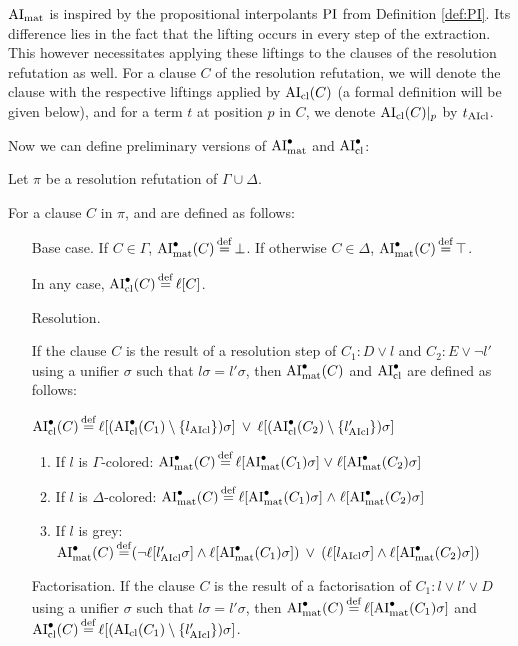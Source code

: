 \documentclass[,%
	draft=false,%
	numbers=noendperiod
	11pt,
	a4paper,
	oneside,%
	openany,
]{memoir}
\begin{document}
$\operatorname{AI}_\mathrm{mat}$ is inspired by the propositional interpolants $\operatorname{PI}$ from Definition \ref{def:PI}.
Its difference lies in the fact that the lifting occurs in every step of the extraction.
This however necessitates applying these liftings to the clauses of the resolution refutation as well.
For a clause $C$ of the resolution refutation, we will denote the clause with the respective liftings applied by $\operatorname{AI}_\mathrm{cl}(C)$ (a formal definition will be given below), and for a term $t$ at position $p$ in $C$, we denote $\operatorname{AI}_\mathrm{cl}(C)|_{p}$ by $t_{\operatorname{AIcl}}$.

Now we can define preliminary versions of $\operatorname{AI}_\mathrm{mat}^\bullet$ and $\operatorname{AI}_\mathrm{cl}^\bullet$:

\begin{defi}
	Let $\pi$ be a resolution refutation of $\Gamma \cup \Delta$.

	For a clause $C$ in $\pi$,  and  are defined as follows:
	\begin{itemize}
		\item[Base case.]
			If $C \in \Gamma$, $\operatorname{AI}_\mathrm{mat}^\bullet(C) \operatorname{\stackrel{\mathrm{def}}{=}} \bot$.
			If otherwise $C \in \Delta$, $\operatorname{AI}_\mathrm{mat}^\bullet(C) \operatorname{\stackrel{\mathrm{def}}{=}} \top$.

			In any case, $\operatorname{AI}_\mathrm{cl}^\bullet(C) \operatorname{\stackrel{\mathrm{def}}{=}} \ell[C]$.
		\item[Resolution.]

			If the clause $C$ is the result of a resolution step of $C_1: D \lor l$ and $C_2: E \lor \lnot l'$ using a unifier $\sigma$ such that $l\sigma =  l'\sigma$, then $\operatorname{AI}_\mathrm{mat}^\bullet(C)$ and $\operatorname{AI}_\mathrm{cl}^\bullet$ are defined as follows:

			$\operatorname{AI}_\mathrm{cl}^\bullet(C) \operatorname{\stackrel{\mathrm{def}}{=}} \ell[(\operatorname{AI}_\mathrm{cl}^\bullet(C_1) \setminus \{l_{\operatorname{AIcl}}\})\sigma] \;\,{\lor}\;\, \ell[(\operatorname{AI}_\mathrm{cl}^\bullet(C_2)\setminus \{l_{\operatorname{AIcl}}'\})\sigma] $

			\begin{enumerate}

				\item If $l$ is $\Gamma$-colored:
					$\operatorname{AI}_\mathrm{mat}^\bullet(C) \operatorname{\stackrel{\mathrm{def}}{=}} \ell[\operatorname{AI}_\mathrm{mat}^\bullet(C_1)\sigma]\;{\lor}\; \ell[\operatorname{AI}_\mathrm{mat}^\bullet(C_2)\sigma] $

				\item If $l$ is $\Delta$-colored:
					$\operatorname{AI}_\mathrm{mat}^\bullet(C) \operatorname{\stackrel{\mathrm{def}}{=}} \ell[\operatorname{AI}_\mathrm{mat}^\bullet(C_1)\sigma]\;{\land}\; \ell[\operatorname{AI}_\mathrm{mat}^\bullet(C_2)\sigma] $

				\item If $l$ is grey:
					$\operatorname{AI}_\mathrm{mat}^\bullet(C) \operatorname{\stackrel{\mathrm{def}}{=}}
					(\lnot {\ell[l'\ensuremath{_{\operatorname{AIcl}}}\sigma]} \land \ell[\operatorname{AI}_\mathrm{mat}^\bullet(C_1)\sigma]) \;\,{\lor}\;\,
					(\ell[l_{\operatorname{AIcl}}\sigma]\land \ell[\operatorname{AI}_\mathrm{mat}^\bullet(C_2)\sigma ])
					$

			\end{enumerate}

		\item[Factorisation.]
			If the clause $C$ is the result of a factorisation of $C_1: l \lor l' \lor D$ using a unifier $\sigma$ such that $l\sigma = l'\sigma$, then $\operatorname{AI}_\mathrm{mat}^\bullet(C) \operatorname{\stackrel{\mathrm{def}}{=}} \ell[\operatorname{AI}_\mathrm{mat}^\bullet(C_1)\sigma]$ and $\AIclpre(C) \defeq \lifboth{ (\AIclause(C_1) \setminus\nolinebreak \{l'\cl\})\sigma}$.
			\qedhere

	\end{itemize}
\end{defi}
\end{document}
